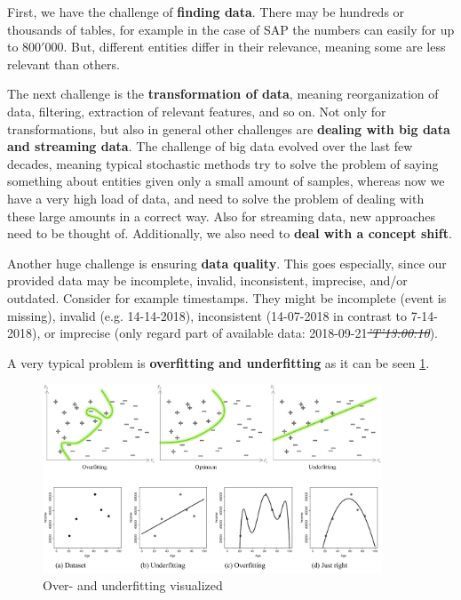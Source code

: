 First, we have the challenge of \textbf{finding data}. There may be hundreds or thousands of tables, for example in the case of SAP the numbers can easily for up to $800'000$. But, different entities differ in their relevance, meaning some are less relevant than others.

The next challenge is the \textbf{transformation of data}, meaning reorganization of data, filtering, extraction of relevant features, and so on. Not only for transformations, but also in general other challenges are \textbf{dealing with big data and streaming data}. The challenge of big data evolved over the last few decades, meaning typical stochastic methods try to solve the problem of saying something about entities given only a small amount of samples, whereas now we have a very high load of data, and need to solve the problem of dealing with these large amounts in a correct way. Also for streaming data, new approaches need to be thought of. Additionally, we also need to \textbf{deal with a concept shift}.

Another huge challenge is ensuring \textbf{data quality}. This goes especially, since our provided data may be incomplete, invalid, inconsistent, imprecise, and/or outdated. Consider for example timestamps. They might be incomplete {\color{gray}\footnotesize(event is missing)}, invalid {\color{gray}\footnotesize(e.g. 14-14-2018)}, inconsistent {\color{gray}\footnotesize(14-07-2018 in contrast to 7-14-2018)}, or imprecise {\color{gray}\footnotesize(only regard part of available data: 2018-09-21\textit{\st{'T'13:00:10}})}.

A very typical problem is \textbf{overfitting and underfitting} as it can be seen \ref{fig:1_over_under_fitting}.

\begin{figure}[H]
  \centering
  \includegraphics[width=0.9\textwidth]{assets/basics/over_under_fitting.png}
  \caption{Over- and underfitting visualized}
  \label{fig:1_over_under_fitting}
\end{figure}

